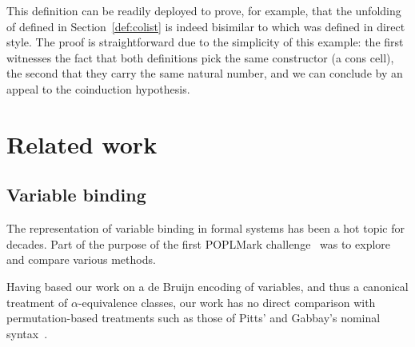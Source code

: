 \begin{agdasnippet}
\end{agdasnippet}

This definition can be readily deployed to prove, for example, that the unfolding
of  defined in Section~\ref{def:colist} is indeed bisimilar to 
which was defined in direct style. The proof is straightforward due to the simplicity
of this example: the first  witnesses the fact that both definitions
pick the same constructor (a cons cell), the second that they carry the
same natural number, and we can conclude by an appeal to the coinduction
hypothesis.

\begin{agdasnippet}
\end{agdasnippet}





\section{Related work}\label{section:related-work}

\subsection{Variable binding} The representation of variable binding
in formal systems has been a hot topic for decades. Part of the purpose
of the first POPLMark challenge~\citeyear{poplmark} was to explore and
compare various methods.

Having based our work on a de Bruijn encoding of variables, and thus a
canonical treatment of \(\alpha\)-equivalence classes, our work has no
direct comparison with permutation-based treatments such as those of
Pitts' and Gabbay's nominal syntax~\citeyear{gabbay:newaas-jv}.

